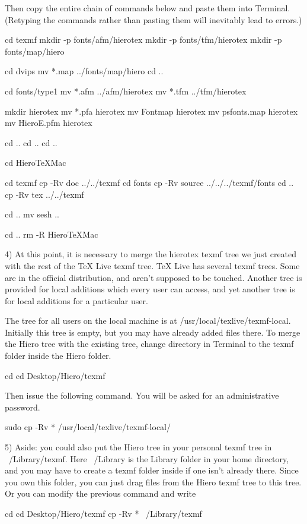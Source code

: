 Then copy the entire chain of commands below and paste them into Terminal. (Retyping the commands rather than pasting them will inevitably lead to errors.)

	cd texmf
	mkdir -p fonts/afm/hierotex
	mkdir -p fonts/tfm/hierotex
	mkdir -p fonts/map/hiero

	cd dvips
	mv *.map ../fonts/map/hiero
	cd ..

	cd fonts/type1
	mv *.afm ../afm/hierotex
	mv *.tfm ../tfm/hierotex

	mkdir hierotex
	mv *.pfa hierotex
	mv Fontmap hierotex
	mv psfonts.map hierotex
	mv HieroE.pfm hierotex

	cd ..
	cd ..
	cd ..
	
	cd HieroTeXMac
	
	cd texmf
	cp -Rv doc ../../texmf
	cd fonts
	cp -Rv source ../../../texmf/fonts
	cd ..
	cp -Rv tex ../../texmf

	cd ..
	mv sesh ..
	
	cd ..
	rm -R HieroTeXMac
	
4) At this point, it is necessary to merge the hierotex texmf tree we just created with the rest of the TeX Live texmf tree. TeX Live has several texmf trees. Some are in the official distribution, and aren't supposed to be touched. Another tree is provided for local additions which every user can access, and yet another tree is for local additions for a particular user.

The tree for all users on the local machine is at /usr/local/texlive/texmf-local. Initially this tree is empty, but you may have already added files there. To merge the Hiero tree with the existing tree, change directory in Terminal to the texmf folder inside the Hiero folder. 

	cd
	cd Desktop/Hiero/texmf

Then issue the following command. You will be asked for an administrative password.

	sudo cp -Rv *  /usr/local/texlive/texmf-local/

5) Aside: you could also put the Hiero tree in your personal texmf tree in ~/Library/texmf. Here ~/Library is the Library folder in your home directory, and you may have to create a texmf folder inside if one isn't already there. Since you own this folder, you can just drag files from the Hiero texmf tree to this tree. Or you can modify the previous command and write

	cd
	cd Desktop/Hiero/texmf
	cp -Rv *  ~/Library/texmf
	
